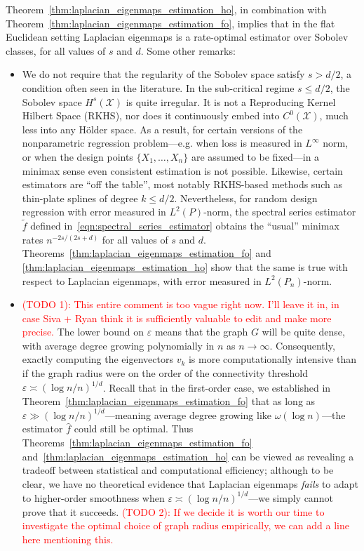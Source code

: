 \documentclass{article}
\newcommand{\1}{\mathbf{1}}
\newcommand{\Leb}{L}
\newcommand{\mc}[1]{\mathcal{#1}}
\newcommand{\wt}[1]{\widetilde{#1}}
\newcommand{\wh}[1]{\widehat{#1}}
\theoremstyle{alden}
\theoremstyle{aldenthm}
\theoremstyle{definition}
\theoremstyle{remark}
\begin{document}
Theorem~\ref{thm:laplacian_eigenmaps_estimation_ho}, in combination with Theorem~\ref{thm:laplacian_eigenmaps_estimation_fo}, implies that in the flat Euclidean setting Laplacian eigenmaps is a rate-optimal estimator over Sobolev classes, for all values of $s$ and $d$. Some other remarks:
\begin{itemize}
	\item We do not require that the regularity of the Sobolev space satisfy $s > d/2$, a condition often seen in the literature. In the sub-critical regime $s \leq d/2$, the Sobolev space $H^s(\mc{X})$ is quite irregular. It is not a Reproducing Kernel Hilbert Space (RKHS), nor does it continuously embed into $C^0(\mc{X})$, much less into any H\"{o}lder space. As a result, for certain versions of the nonparametric regression problem---e.g. when loss is measured in $\Leb^{\infty}$ norm, or when the design points $\{X_1,\ldots,X_n\}$ are assumed to be fixed---in a minimax sense even consistent estimation is not possible. Likewise, certain estimators are ``off the table'', most notably RKHS-based methods such as thin-plate splines of degree $k \leq d/2$. Nevertheless, for random design regression with error measured in $\Leb^2(P)$-norm, the spectral series estimator $\wt{f}$ defined in~\eqref{eqn:spectral_series_estimator} obtains the ``usual'' minimax rates $n^{-2s/(2s + d)}$ for all values of $s$ and $d$. Theorems~\ref{thm:laplacian_eigenmaps_estimation_fo} and \ref{thm:laplacian_eigenmaps_estimation_ho} show that the same is true with respect to Laplacian eigenmaps, with error measured in $\Leb^2(P_n)$-norm.
	\item \textcolor{red}{(TODO 1): This entire comment is too vague right now. I'll leave it in, in case Siva + Ryan think it is sufficiently valuable to edit and make more precise.} The lower bound on $\varepsilon$ means that the graph $G$ will be quite dense, with average degree growing polynomially in $n$ as $n \to \infty$. Consequently, exactly computing the eigenvectors $v_k$ is more computationally intensive than if the graph radius were on the order of the connectivity threshold $\varepsilon \asymp (\log n/n)^{1/d}$. Recall that in the first-order case, we established in Theorem~\ref{thm:laplacian_eigenmaps_estimation_fo} that as long as $\varepsilon \gg (\log n/n)^{1/d}$---meaning average degree growing like $\omega(\log n)$---the estimator $\wh{f}$ could still be optimal. Thus Theorems~\ref{thm:laplacian_eigenmaps_estimation_fo} and~\ref{thm:laplacian_eigenmaps_estimation_ho} can be viewed as revealing a tradeoff between statistical and computational efficiency; although to be clear, we have no theoretical evidence that Laplacian eigenmaps \emph{fails} to adapt to higher-order smoothness when $\varepsilon \asymp (\log n/n)^{1/d}$---we simply cannot prove that it succeeds. 
	\textcolor{red}{(TODO 2): If we decide it is worth our time to investigate the optimal choice of graph radius empirically, we can add a line here mentioning this.}
	

\end{itemize}
\end{document}
